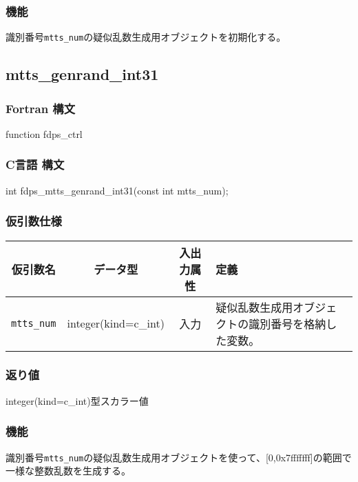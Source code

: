 \subsubsection*{機能}
識別番号\texttt{mtts\_num}の疑似乱数生成用オブジェクトを初期化する。
\clearpage

\subsection{mtts\_genrand\_int31}
\subsubsection*{Fortran 構文}
\begin{screen}
\begin{spverbatim}  
function fdps_ctrl%
\end{spverbatim}
\end{screen}

\subsubsection*{C言語 構文}
\begin{screen}
\begin{spverbatim}  
int fdps_mtts_genrand_int31(const int mtts_num);
\end{spverbatim}
\end{screen}

\subsubsection*{仮引数仕様}
\begin{table}[h]
\begin{tabularx}{\linewidth}{cccX}
\toprule
\rowcolor{Snow2}
仮引数名 & データ型 & 入出力属性 & 定義 \\
\midrule
\verb|mtts_num| & integer(kind=c\_int) & 入力 & 疑似乱数生成用オブジェクトの識別番号を格納した変数。\\
\bottomrule
\end{tabularx}
\end{table}

\subsubsection*{返り値}
integer(kind=c\_int)型スカラー値

\subsubsection*{機能}
識別番号\texttt{mtts\_num}の疑似乱数生成用オブジェクトを使って、[0,0x7fffffff]の範囲で一様な整数乱数を生成する。
\clearpage

